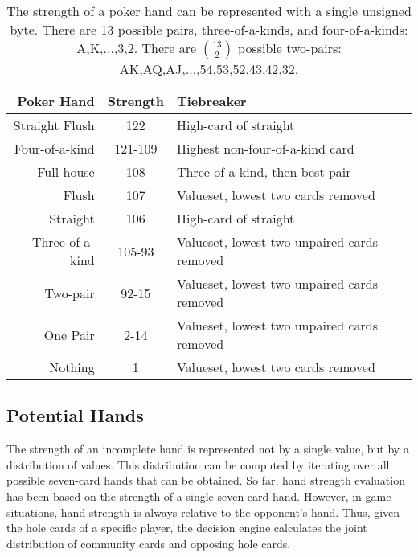 \begin{table}[htb]
\captionsetup{position=top}
\caption[Hand Strength Byte]{The strength of a poker hand can be represented with a single unsigned byte.
There are 13 possible pairs, three-of-a-kinds, and four-of-a-kinds: A,K,...,3,2.
There are $\binom{13}{2}$ possible two-pairs: AK,AQ,AJ,...,54,53,52,43,42,32.}
\begin{small}
\begin{center}
\begin{tabular}{|r|c|l|}
\hline
Poker Hand      & Strength & Tiebreaker                                   \\ \hline
Straight Flush  & 122      & High-card of straight                        \\%
Four-of-a-kind  & 121-109  & Highest non-four-of-a-kind card              \\
Full house      & 108      & Three-of-a-kind, then best pair              \\
Flush           & 107      & Valueset, lowest two cards removed           \\
Straight        & 106      & High-card of straight                        \\
Three-of-a-kind & 105-93   & Valueset, lowest two unpaired cards removed  \\
Two-pair        & 92-15    & Valueset, lowest two unpaired cards removed  \\
One Pair        & 2-14     & Valueset, lowest two unpaired cards removed  \\
Nothing         & 1        & Valueset, lowest two cards removed           \\
\hline
\end{tabular}
\label{tab:StrengthByte}
\end{center}
\end{small}
\end{table}


\subsection{Potential Hands}
\label{sec:PotentialHands}

The strength of an incomplete hand is represented not by a single value, but by a distribution of values.
This distribution can be computed by iterating over all possible seven-card hands that can be obtained.%
So far, hand strength evaluation has been based on the strength of a single seven-card hand.
However, in game situations, hand strength is always relative to the opponent's hand.
Thus, given the hole cards of a specific player, the decision engine calculates the joint distribution of community cards and opposing hole cards.

